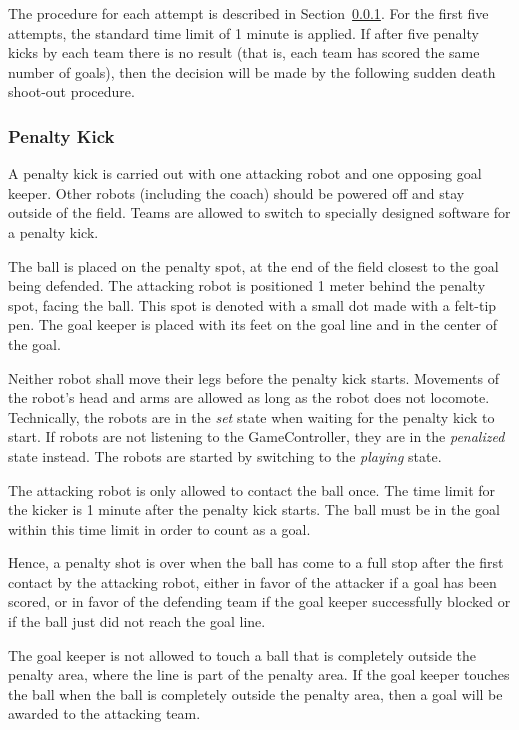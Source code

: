 \documentclass[12pt]{article}
\begin{document}
The procedure for each attempt is described in Section~\ref{sec:penalty_kick}. For the first five attempts, the standard time limit of 1 minute is applied. If after five penalty kicks by each team there is no result (that is, each team has scored the same number of goals), then the decision will be made by the following sudden death shoot-out procedure.

\subsubsection{Penalty Kick}
\label{sec:penalty_kick}

A penalty kick is carried out with one attacking robot and one opposing goal keeper. Other robots (including the coach) should be powered off and stay outside of the field. Teams are allowed to switch to specially designed software for a penalty kick. 

The ball is placed on the penalty spot, at the end of the field closest to the goal being defended. The attacking robot is positioned 1 meter behind the penalty spot, facing the ball.  This spot is denoted with a small dot made with a felt-tip pen. The goal keeper is placed with its feet on the goal line and in the center of the goal.

Neither robot shall move their legs before the penalty kick starts. Movements of the robot's head and arms are allowed as long as the robot does not locomote. Technically, the robots are in the \emph{set} state when waiting for the penalty kick to start. If robots are not listening to the GameController, they are in the \emph{penalized} state instead. The robots are started by switching to the \emph{playing} state.

The attacking robot is only allowed to contact the ball once.  The time limit for the kicker is 1 minute after the penalty kick starts. The ball must be in the goal within this time limit in order to count as a goal.

Hence, a penalty shot is over when the ball has come to a full stop after the first contact by the attacking robot, either in favor of the attacker if a goal has been scored, or in favor of the defending team if the goal keeper successfully blocked or if the ball just did not reach the goal line.

The goal keeper is not allowed to touch a ball that is completely outside the penalty area, where the line is part of the penalty area. If the goal keeper touches the ball when the ball is completely outside the penalty area, then a goal will be awarded to the attacking team.
\end{document}
